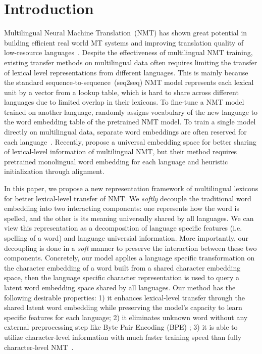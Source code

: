 \section{\label{sec:introduction}Introduction}
Multilingual Neural Machine Translation~(NMT) has shown great potential in building efficient real world MT systems and improving translation quality of low-resource languages~\citep{google_multi_nmt,multi_nmt_adapt,universal_nmt,rapid_adapt_nmt,multi_nmt_shared_attn,multi_nmt_bpe_share}. Despite the effectiveness of multilingual NMT training, existing transfer methods on multilingual data often requires limiting the transfer of lexical level representations from different languages. This is mainly because the standard sequence-to-sequence~(seq2seq) NMT model represents each lexical unit by a vector from a lookup table, which is hard to share across different languages due to limited overlap in their lexicons. To fine-tune a NMT model trained on another language, \cite{multi_nmt_adapt} randomly assigns vocabulary of the new language to the word embedding table of the pretrained NMT model. To train a single model directly on multilingual data, separate word embeddings are often reserved for each language~\citep{rapid_adapt_nmt,google_multi_nmt,multi_nmt_share_enc}. Recently, \cite{universal_nmt} propose a universal embedding space for better sharing of lexical-level information of multilingual NMT, but their method requires pretrained monolingual word embedding for each language and heuristic initialization through alignment.

In this paper, we propose a new representation framework of multilingual lexicons for better lexical-level transfer of NMT. We \textit{softly} decouple the traditional word embedding into two interacting components: one represents how the word is spelled, and the other is its meaning universally shared by all languages. We can view this representation as a decomposition of language specific features (i.e. spelling of a word) and language universial information. More importantly, our decoupling is done in a \textit{soft} manner to preserve the interaction between these two components. Concretely, our model applies a language specific transformation on the character embedding of a word built from a shared character embedding space, then the language specific character representation is used to query a latent word embedding space shared by all languages. Our method has the following desirable properties: 1) it enhances lexical-level transfer through the shared latent word embedding while preserving the model's capacity to learn specific features for each language; 2) it eliminates unknown word without any external preprocessing step like Byte Pair Encoding (BPE) \citep{bpe}; 3) it is able to utilize character-level information with much faster training speed than fully character-level NMT~\citep{}.